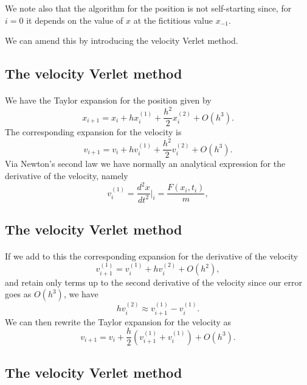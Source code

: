 \documentclass[%
oneside,                 %
final,                   %
10pt]{article}
\begin{document}
We note also that the algorithm for the position is not self-starting since, for $i=0$ it depends on the value of $x$ 
at the fictitious value $x_{-1}$. 

We can amend this by introducing the velocity Verlet method.

 

\subsection*{The velocity Verlet method}

\paragraph{}
We have the Taylor expansion for the position given by
\[
x_{i+1} = x_i+hx^{(1)}_i+\frac{h^2}{2}x^{(2)}_i+O(h^3).
\]
The corresponding expansion for the velocity is 
\[
v_{i+1} = v_i+hv^{(1)}_i+\frac{h^2}{2}v^{(2)}_i+O(h^3).
\]
Via Newton's second law we have normally an analytical expression for the derivative of the velocity, namely
\[
v^{(1)}_i = \frac{d^2 x}{dt^2}\vert_{i}= \frac{F(x_i,t_i)}{m},
\]




\subsection*{The velocity Verlet method}

\paragraph{}
If we add to this the corresponding expansion for the derivative of the velocity 
\[
v^{(1)}_{i+1} = v^{(1)}_i+hv^{(2)}_i+O(h^2), 
\]
and retain only terms up to the second derivative of the velocity since our error goes as $O(h^3)$, we have
\[
hv^{(2)}_i\approx v^{(1)}_{i+1}-v^{(1)}_i.
\]
We can then rewrite the Taylor expansion for the velocity as  
\[
v_{i+1} = v_i+\frac{h}{2}\left( v^{(1)}_{i+1}+v^{(1)}_{i}\right)+O(h^3).
\]





\subsection*{The velocity Verlet method}
\end{document}
